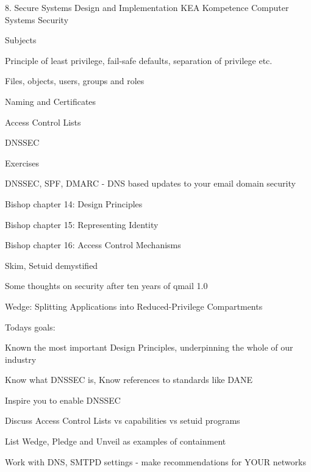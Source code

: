 \documentclass[Screen16to9,17pt]{foils}
\begin{document}
\mytitlepage
{8. Secure Systems Design and Implementation}
{KEA Kompetence Computer Systems Security \the\year}



\begin{list1}
\item Subjects
\begin{list2}
\item Principle of least privilege, fail-safe defaults, separation of privilege etc.
\item Files, objects, users, groups and roles
\item Naming and Certificates
\item Access Control Lists
\item DNSSEC
\end{list2}
\item Exercises
\begin{list2}
\item DNSSEC, SPF, DMARC - DNS based updates to your email domain security
\end{list2}
\end{list1}




\begin{list1}
\item Bishop chapter 14: Design Principles
\item Bishop chapter 15: Representing Identity
\item Bishop chapter 16: Access Control Mechanisms
\item Skim, Setuid demystified
\item Some thoughts on security after ten years of qmail 1.0
\item Wedge: Splitting Applications into Reduced-Privilege Compartments
\end{list1}


Todays goals:
\begin{list2}
\item Known the most important Design Principles, underpinning the whole of our industry
\item Know what DNSSEC is, Know references to standards like DANE
\item Inspire you to enable DNSSEC
\item Discuss Access Control Lists vs capabilities vs setuid programs
\item List Wedge, Pledge and Unveil as examples of containment
\item Work with DNS, SMTPD settings - make recommendations for YOUR networks
\end{list2}
\end{document}

